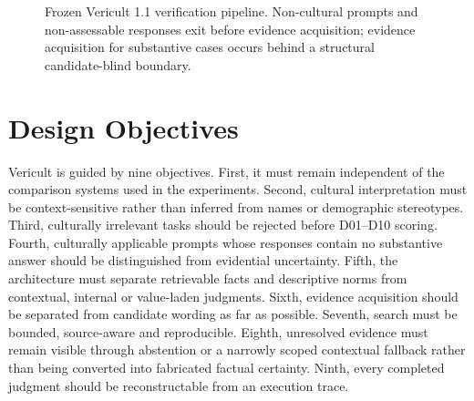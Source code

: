 \begin{figure}[htbp]
\centering
{}
\caption{Frozen Vericult 1.1 verification pipeline. Non-cultural prompts and non-assessable responses exit before evidence acquisition; evidence acquisition for substantive cases occurs behind a structural candidate-blind boundary.}
\label{fig:vericult-pipeline}
\end{figure}


\section{Design Objectives}

Vericult is guided by nine objectives. First, it must remain independent of the comparison systems used in the experiments. Second, cultural interpretation must be context-sensitive rather than inferred from names or demographic stereotypes. Third, culturally irrelevant tasks should be rejected before D01--D10 scoring. Fourth, culturally applicable prompts whose responses contain no substantive answer should be distinguished from evidential uncertainty. Fifth, the architecture must separate retrievable facts and descriptive norms from contextual, internal or value-laden judgments. Sixth, evidence acquisition should be separated from candidate wording as far as possible. Seventh, search must be bounded, source-aware and reproducible. Eighth, unresolved evidence must remain visible through abstention or a narrowly scoped contextual fallback rather than being converted into fabricated factual certainty. Ninth, every completed judgment should be reconstructable from an execution trace.

